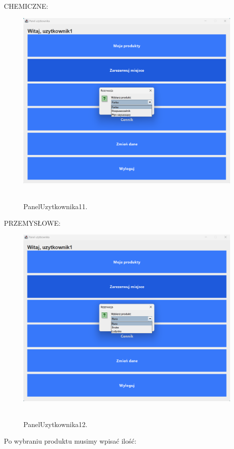 CHEMICZNE:
\begin{figure}[H]
    \centering
    \includegraphics[width=.9\linewidth]{figures/PanelUzytkownika11.png}\
    \caption{PanelUzytkownika11.\label{PanelUzytkownika11}}
\end{figure}

PRZEMYSŁOWE:
\begin{figure}[H]
    \centering
    \includegraphics[width=.9\linewidth]{figures/PanelUzytkownika12.png}\
    \caption{PanelUzytkownika12.\label{PanelUzytkownika12}}
\end{figure}

Po wybraniu produktu musimy wpisać ilość:

